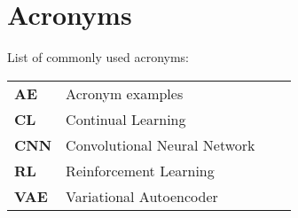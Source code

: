 
\chapter{Acronyms}
\label{chap:acronyms}

List of commonly used acronyms: \\

\begin{tabular}{llll}
	\textbf{AE}			&	Acronym examples \\
	\textbf{CL}			& 	Continual Learning \\
	\textbf{CNN}		& 	Convolutional Neural Network \\
	\textbf{RL}			& 	Reinforcement Learning \\
	\textbf{VAE}		&	Variational Autoencoder \\
	
\end{tabular}